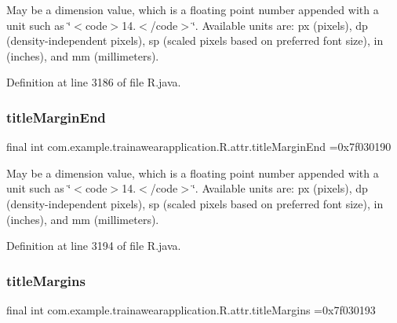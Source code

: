 May be a dimension value, which is a floating point number appended with a unit such as \char`\"{}$<$code$>$14.\+5sp$<$/code$>$\char`\"{}. Available units are\+: px (pixels), dp (density-\/independent pixels), sp (scaled pixels based on preferred font size), in (inches), and mm (millimeters). 

Definition at line 3186 of file R.\+java.

\mbox{\label{classcom_1_1example_1_1trainawearapplication_1_1_r_1_1attr_a9888cd8bb9187fa5f389980f1815eb03}} 
\subsubsection{\texorpdfstring{titleMarginEnd}{titleMarginEnd}}
{\footnotesize\ttfamily final int com.\+example.\+trainawearapplication.\+R.\+attr.\+title\+Margin\+End =0x7f030190\hspace{0.3cm}{\ttfamily [static]}}

May be a dimension value, which is a floating point number appended with a unit such as \char`\"{}$<$code$>$14.\+5sp$<$/code$>$\char`\"{}. Available units are\+: px (pixels), dp (density-\/independent pixels), sp (scaled pixels based on preferred font size), in (inches), and mm (millimeters). 

Definition at line 3194 of file R.\+java.

\mbox{\label{classcom_1_1example_1_1trainawearapplication_1_1_r_1_1attr_af894c6bf018c309ec3144ae34932f5d4}} 
\subsubsection{\texorpdfstring{titleMargins}{titleMargins}}
{\footnotesize\ttfamily final int com.\+example.\+trainawearapplication.\+R.\+attr.\+title\+Margins =0x7f030193\hspace{0.3cm}{\ttfamily [static]}}

